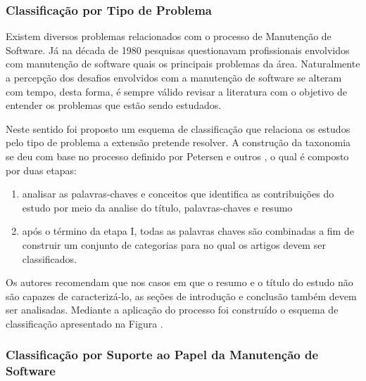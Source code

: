 \documentclass[msc]{ppgccufmg} %
\begin{document}
\subsubsection{Classificação por Tipo de Problema}
\label{subsubsec:map-esquema-suporte-problema}

Existem diversos problemas relacionados com o processo de Manutenção de Software. Já na década de
1980 pesquisas questionavam profissionais envolvidos com manutenção de software quais os principais
problemas da área\cite{Lientz:1981:PAS:358790.358796}. Naturalmente a percepção dos desafios
envolvidos com a manutenção de software se alteram com tempo, desta forma, é sempre válido
revisar a literatura com o objetivo de entender os problemas que estão sendo estudados.

Neste sentido foi proposto um esquema de classificação que relaciona os estudos pelo tipo de
problema a extensão pretende resolver. A construção da taxonomia se deu com base no processo
definido por Petersen e outros \cite{Petersen2008}, o qual é composto por duas etapas:

\begin{enumerate}[I] 
	\item analisar as palavras-chaves e conceitos que identifica as contribuições do estudo por meio da analise do título, palavras-chaves e resumo
	\item após o término da etapa I, todas as palavras chaves são combinadas a fim de construir um conjunto de categorias para no qual os artigos devem ser classificados.
\end{enumerate} 

Os autores recomendam que nos casos em que o resumo e o
título do estudo não são capazes de caracterizá-lo, as seções de introdução e
conclusão também devem ser analisadas. Mediante a aplicação do processo foi
construído o esquema de classificação apresentado na Figura  .


\subsubsection{Classificação por Suporte ao Papel da Manutenção de Software}
\label{subsubsec:map-esquema-suporte-papel-man}
\end{document}
